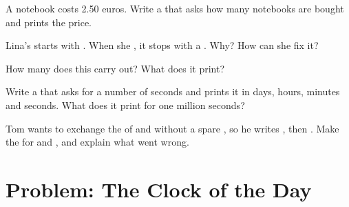 \begin{exercise}[$\star\star$]\label{exo:g6:variables-and-input:8}
A notebook costs 2.50 euros. Write a  that asks how many notebooks are
bought and prints the price.
\end{exercise}

\begin{exercise}[$\star\star$]\label{exo:g6:variables-and-input:9}
Lina's  starts with . When she 
, it stops with a . Why? How can she fix it?
\end{exercise}

\begin{exercise}[$\star\star\star$]\label{exo:g6:variables-and-input:10}
How many  does this  carry out? What does it print?

\label{lst:g6:variables-and-input:count-me}
\end{exercise}

\begin{exercise}[$\star\star\star$]\label{exo:g6:variables-and-input:11}
Write a  that asks for a number of seconds and prints it in days, hours,
minutes and seconds. What does it print for one million seconds?
\end{exercise}

\begin{exercise}[$\star\star\star$]\label{exo:g6:variables-and-input:12}
Tom wants to exchange the  of  and  without a spare
, so he writes , then . Make the 
for  and , and explain what went wrong.
\end{exercise}

\section{Problem: The Clock of the Day}

